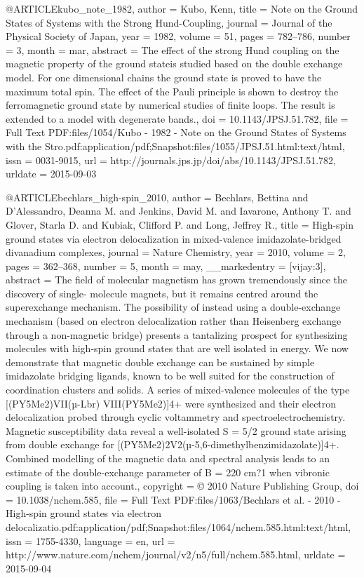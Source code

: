@ARTICLE{kubo_note_1982,
  author = {Kubo, Kenn},
  title = {Note on the {Ground} {States} of {Systems} with the {Strong} {Hund}-{Coupling}},
  journal = {Journal of the Physical Society of Japan},
  year = {1982},
  volume = {51},
  pages = {782--786},
  number = {3},
  month = mar,
  abstract = {The effect of the strong Hund coupling on the magnetic property of
	the ground stateis studied based on the double exchange model. For
	one dimensional chains the ground state is proved to have the maximum
	total spin. The effect of the Pauli principle is shown to destroy
	the ferromagnetic ground state by numerical studies of finite loops.
	The result is extended to a model with degenerate bands.},
  doi = {10.1143/JPSJ.51.782},
  file = {Full Text PDF:files/1054/Kubo - 1982 - Note on the Ground States of Systems with the Stro.pdf:application/pdf;Snapshot:files/1055/JPSJ.51.html:text/html},
  issn = {0031-9015},
  url = {http://journals.jps.jp/doi/abs/10.1143/JPSJ.51.782},
  urldate = {2015-09-03}
}

@ARTICLE{bechlars_high-spin_2010,
  author = {Bechlars, Bettina and D'Alessandro, Deanna M. and Jenkins, David
	M. and Iavarone, Anthony T. and Glover, Starla D. and Kubiak, Clifford
	P. and Long, Jeffrey R.},
  title = {High-spin ground states via electron delocalization in mixed-valence
	imidazolate-bridged divanadium complexes},
  journal = {Nature Chemistry},
  year = {2010},
  volume = {2},
  pages = {362--368},
  number = {5},
  month = may,
  __markedentry = {[vijay:3]},
  abstract = {The field of molecular magnetism has grown tremendously since the
	discovery of single- molecule magnets, but it remains centred around
	the superexchange mechanism. The possibility of instead using a double-exchange
	mechanism (based on electron delocalization rather than Heisenberg
	exchange through a non-magnetic bridge) presents a tantalizing prospect
	for synthesizing molecules with high-spin ground states that are
	well isolated in energy. We now demonstrate that magnetic double
	exchange can be sustained by simple imidazolate bridging ligands,
	known to be well suited for the construction of coordination clusters
	and solids. A series of mixed-valence molecules of the type [(PY5Me2)VII(µ-Lbr)
	VIII(PY5Me2)]4+ were synthesized and their electron delocalization
	probed through cyclic voltammetry and spectroelectrochemistry. Magnetic
	susceptibility data reveal a well-isolated S = 5/2 ground state arising
	from double exchange for [(PY5Me2)2V2(µ-5,6-dimethylbenzimidazolate)]4+.
	Combined modelling of the magnetic data and spectral analysis leads
	to an estimate of the double-exchange parameter of B = 220 cm?1 when
	vibronic coupling is taken into account.},
  copyright = {© 2010 Nature Publishing Group},
  doi = {10.1038/nchem.585},
  file = {Full Text PDF:files/1063/Bechlars et al. - 2010 - High-spin ground states via electron        delocalizatio.pdf:application/pdf;Snapshot:files/1064/nchem.585.html:text/html},
  issn = {1755-4330},
  language = {en},
  url = {http://www.nature.com/nchem/journal/v2/n5/full/nchem.585.html},
  urldate = {2015-09-04}
}

